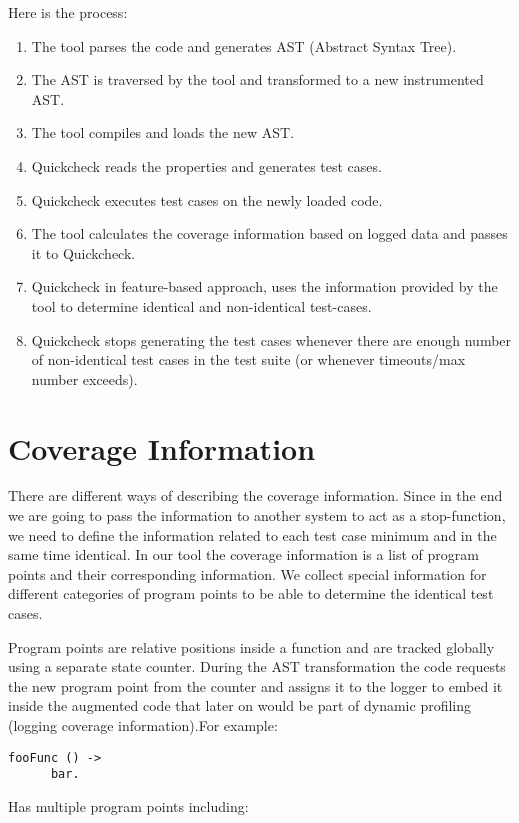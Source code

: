 \documentclass[12pt,a4paper]{report}
\begin{document}
Here is the process:
\begin{enumerate}
 \item The tool parses the code and generates AST (Abstract Syntax Tree).
 \item The AST is traversed by the tool and transformed to a new instrumented AST.
 \item The tool compiles and loads the new AST.
 \item Quickcheck reads the properties and generates test cases.
 \item Quickcheck executes test cases on the newly loaded code.
 \item The tool calculates the coverage information based on logged data and passes it to Quickcheck.
 \item Quickcheck in feature-based approach, uses the information provided by the tool to determine identical and non-identical test-cases.
 \item Quickcheck stops generating the test cases whenever there are enough number of non-identical test cases in the test suite (or 
whenever timeouts/max number exceeds).
\end{enumerate}

\section{Coverage Information}
There are different ways of describing the coverage information. Since in the end we are going to pass the information to another system to act as a stop-function, we need to
 define the information related to each test case minimum and in the same time identical. In our tool the coverage information is a list of program points and their
 corresponding information. We collect special information for different categories of program points to be able to determine the identical test cases.

Program points are relative positions inside a function and are tracked globally using a separate state counter. During the AST transformation the code requests the new
 program point from the counter and assigns it to the logger to embed it inside the augmented code that later on would be part of dynamic profiling (logging coverage
 information).For example:

\begin{lstlisting}
fooFunc () -> 
      bar.  
\end{lstlisting}

Has multiple program points including:
\end{document}
